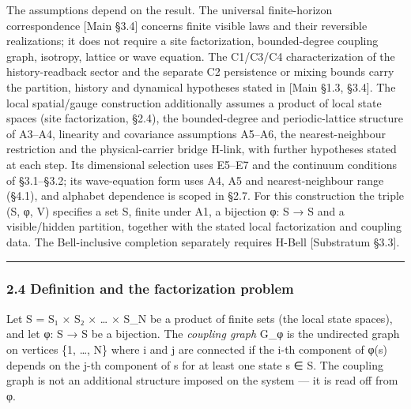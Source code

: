 \documentclass[
]{article}
\begin{document}
The assumptions depend on the result. The universal finite-horizon
correspondence {[}Main §3.4{]} concerns finite visible laws and their
reversible realizations; it does not require a site factorization,
bounded-degree coupling graph, isotropy, lattice or wave equation. The
C1/C3/C4 characterization of the history-readback sector and the
separate C2 persistence or mixing bounds carry the partition, history
and dynamical hypotheses stated in {[}Main §1.3, §3.4{]}. The local
spatial/gauge construction additionally assumes a product of local state
spaces (site factorization, §2.4), the bounded-degree and
periodic-lattice structure of A3--A4, linearity and covariance
assumptions A5--A6, the nearest-neighbour restriction and the
physical-carrier bridge H-link, with further hypotheses stated at each
step. Its dimensional selection uses E5--E7 and the continuum conditions
of §3.1--§3.2; its wave-equation form uses A4, A5 and nearest-neighbour
range (§4.1), and alphabet dependence is scoped in §2.7. For this
construction the triple (S, φ, V) specifies a set S, finite under A1, a
bijection φ: S → S and a visible/hidden partition, together with the
stated local factorization and coupling data. The Bell-inclusive
completion separately requires H-Bell {[}Substratum §3.3{]}.

\begin{center}\rule{0.5\linewidth}{0.5pt}\end{center}

\hypertarget{definition-and-the-factorization-problem}{%
\subsubsection{2.4 Definition and the factorization
problem}\label{definition-and-the-factorization-problem}}

Let S = S₁ × S₂ × \ldots{} × S\_N be a product of finite sets (the local
state spaces), and let φ: S → S be a bijection. The \emph{coupling
graph} G\_φ is the undirected graph on vertices \{1, \ldots, N\} where i
and j are connected if the i-th component of φ(s) depends on the j-th
component of s for at least one state s ∈ S. The coupling graph is not
an additional structure imposed on the system --- it is read off from φ.
\end{document}
